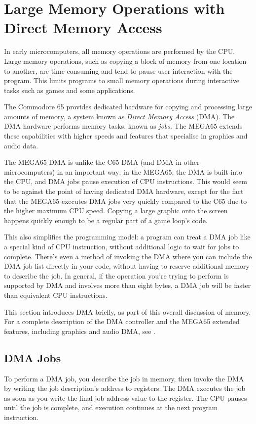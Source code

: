 \newpage
\section{Large Memory Operations with Direct Memory Access}

In early microcomputers, all memory operations are performed by the CPU. Large
memory operations, such as copying a block of memory from one location to
another, are time consuming and tend to pause user interaction with the program. This
limits programs to small memory operations during interactive tasks such as
games and some applications.

The Commodore 65 provides dedicated hardware for copying and processing large
amounts of memory, a system known as {\em Direct Memory Access} (DMA). The DMA
hardware performs memory tasks, known as {\em jobs}. The MEGA65 extends these
capabilities with higher speeds and features that specialise in
graphics and audio data.

The MEGA65 DMA is unlike the C65 DMA (and DMA in other microcomputers) in an
important way: in the MEGA65, the DMA is built into the CPU, and DMA jobs
pause execution of CPU instructions. This would seem to be against the point
of having dedicated DMA hardware, except for the fact that the MEGA65 executes
DMA jobs very quickly compared to the C65 due to the higher maximum CPU speed.
Copying a large graphic onto the screen happens quickly enough to be a regular
part of a game loop's code.

This also simplifies the programming model: a program can treat a DMA job like
a special kind of CPU instruction, without additional logic to wait for jobs
to complete. There's even a method of invoking the DMA where you can include
the DMA job list directly in your code, without having to reserve additional
memory to describe the job. In general, if the operation you're trying to
perform is supported by DMA and involves more than eight bytes, a DMA job will
be faster than equivalent CPU instructions.

This section introduces DMA briefly, as part of this overall discussion of
memory. For a complete description of the DMA controller and the MEGA65
extended features, including graphics and audio DMA, see .

\subsection{DMA Jobs}

To perform a DMA job, you describe the job in memory, then invoke the DMA by
writing the job description's address to registers. The DMA executes the job
as soon as you write the final job address value to the register. The CPU
pauses until the job is complete, and execution continues at the next program
instruction.

